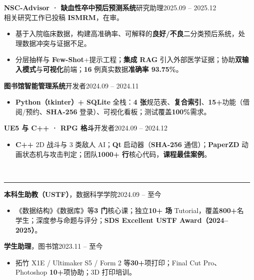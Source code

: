 \documentclass[10pt,letterpaper]{article}
\newcommand{\cvsec}[1]{%
  \par\addvspace{0.36em}%
  \noindent{\large\bfseries #1}\\[-0.22em]%
  {\color{black!45}\rule{\linewidth}{0.4pt}}%
  \par\addvspace{0.16em}%
}
\begin{document}
\vspace{0.1em}
\noindent\textbf{NSC-Advisor · 缺血性卒中预后预测系统}\quad 研究助理\hfill{\normalsize 2025.09 -- 2025.12}\\[0.05em]
{\footnotesize 相关研究工作已投稿 \textbf{ISMRM}，在审。}
\begin{itemize}
  \item 基于入院临床数据，构建高准确率、可解释的\textbf{良好/不良}二分类预后系统，处理数据冲突与证据不足。
  \item 分层抽样与 \textbf{Few-Shot}+提示工程；\textbf{集成 RAG} 引入外部医学证据；协助\textbf{双输入模式}与\textbf{可视化}前端；\textbf{16} 例真实数据\textbf{准确率 93.75\%}。
\end{itemize}

\vspace{0.08em}
\noindent\textbf{图书馆智能管理系统}\quad 开发者\hfill{\normalsize 2024.09 -- 2024.11}
\begin{itemize}
  \item \textbf{Python（tkinter）+ SQLite} 全栈：\textbf{4 张}规范表、\textbf{复合索引}、\textbf{15+}功能（借阅/预约、\textbf{SHA-256} 登录）、可视化看板；测试覆盖\textbf{100\%}需求。
\end{itemize}

\vspace{0.08em}
\noindent\textbf{UE5 与 C++ · RPG 格斗}\quad 开发者\hfill{\normalsize 2024.09 -- 2024.12}
\begin{itemize}
  \item \textbf{C++} 2D 战斗与 3 类敌人 AI；\textbf{Qt} 启动器（\textbf{SHA-256} 通信）；\textbf{PaperZD} 动画状态机与攻击判定；团队\textbf{1000+ 行}核心代码，\textbf{课程最佳案例}。
\end{itemize}

\cvsec{校园职务 · 获奖与技能}
\textbf{本科生助教（USTF）}，数据科学学院\hfill{\normalsize 2024.09 -- 至今}
\begin{itemize}
  \item 《数据结构》《数据库》等\textbf{3 门}核心课；独立\textbf{10+ 场} Tutorial，覆盖\textbf{800+}名学生；深度参与命题与评分；\textbf{SDS Excellent USTF Award（2024--2025）}。
\end{itemize}

\vspace{0.08em}
\noindent\textbf{学生助理}，图书馆\hfill{\normalsize 2023.11 -- 至今}
\begin{itemize}
  \item 拓竹 X1E / Ultimaker S5 / Form 2 等\textbf{30+}项打印；Final Cut Pro、Photoshop \textbf{10+}项协助；3D 打印培训。
\end{itemize}
\end{document}
